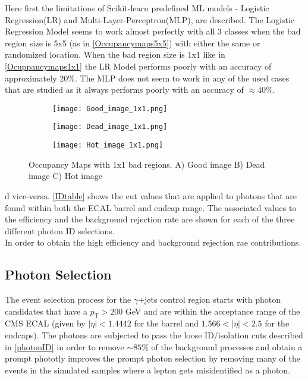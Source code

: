 Here first the limitations of Scikit-learn predefined ML models - Logistic Regression(LR) and Multi-Layer-Perceptron(MLP), are described. The Logistic Regression Model seems to work almost perfectly with all 3 classes when the bad region size is 5x5 (as in \autoref{Occupancymaps5x5}) with either the same or randomized location. When the bad region size is 1x1 like in \autoref{Ocuppancymaps1x1} the LR Model performs poorly with an accuracy of approximately 20\%.
 The MLP does not seem to work in any of the used cases that are studied as it always performs poorly with an accuracy of $\approx 40\%$.

\begin{figure}[h]
\centering
\begin{subfigure}[t]{.313\textwidth}
\texttt{[image: Good\_image\_1x1.png]}
\caption{}
\end{subfigure}
\begin{subfigure}[t]{.3\textwidth}
\texttt{[image: Dead\_image\_1x1.png]}
\caption{}
\end{subfigure}
\begin{subfigure}[t]{.3\textwidth}
\texttt{[image: Hot\_image\_1x1.png]}
\caption{}
\end{subfigure}
\vspace{1cm}
\caption{Occupancy Maps with 1x1 bad regions. A) Good image B) Dead image C) Hot image\label{Ocuppancymaps1x1}}
\end{figure}


d vice-versa. \autoref{IDtable} shows the cut values that are applied to photons that are found within both the ECAL barrel and endcap range. The associated values to the efficiency and the background rejection rate are shown for each of the three different photon ID selections.\\

In order to obtain the high efficiency and background rejection rae contributions.

\subsection{Photon Selection}\label{photonSelection}
The event selection process for the $\gamma$+jets control region starts with photon candidates that have a $p_\text{T} > 200$ GeV and are within the acceptance range of the CMS ECAL (given by $|\eta| < 1.4442$ for the barrel and $1.566 < |\eta| < 2.5$ for the endcaps). The photons are subjected to pass the loose ID/isolation cuts described in \autoref{photonID} in order to remove $\sim85\%$ of the background processes and obtain a prompt phototly improves the prompt photon selection by removing many of the events in the simulated samples where a lepton gets misidentified as a photon.

